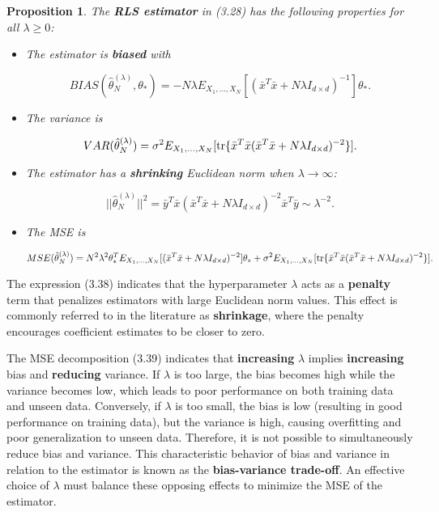 \documentclass{report}
\newtheorem{proposition}{Proposition}[chapter]
\begin{document}
\begin{proposition}
The \textbf{RLS estimator} in (3.28) has the following properties for all $\lambda \geq 0$:
\begin{itemize}
\item The estimator is \textbf{biased} with

\begin{equation}
BIAS(\hat{\theta}_N^{(\lambda)},\theta_*) = -N\lambda E_{X_1,\dots,X_N}[(\bar{x}^T\bar{x}+N\lambda I_{d\times d})^{-1}]\theta_*.
\end{equation}

\item The variance is

\begin{equation}
VAR(\hat{\theta}_N^{(\lambda)}) = \sigma^2E_{X_1,\dots,X_N}[\textup{tr}\{\bar{x}^T\bar{x}(\bar{x}^T\bar{x}+N\lambda I_{d\times d})^{-2}\}].
\end{equation}

\item The estimator has a \textbf{shrinking} Euclidean norm when $\lambda \to \infty$:

\begin{equation}
||\hat{\theta}_N^{(\lambda)}||^2 = \bar{y}^T\bar{x}(\bar{x}^T\bar{x} +N\lambda I_{d\times d})^{-2}\bar{x}^T\bar{y} \sim \lambda^{-2}.
\end{equation}

\item The MSE is

\begin{equation}
MSE(\hat{\theta}_N^{(\lambda)}) = N^2\lambda^2\theta_*^TE_{X_1,\dots,X_N}[(\bar{x}^T\bar{x}+N\lambda I_{d\times d})^{-2}]\theta_* +  \sigma^2E_{X_1,\dots,X_N}[\textup{tr}\{\bar{x}^T\bar{x}(\bar{x}^T\bar{x}+N\lambda I_{d\times d})^{-2}\}].
\end{equation}
\end{itemize}
\end{proposition}

The expression (3.38) indicates that the hyperparameter $\lambda$ acts as a \textbf{penalty} term that penalizes estimators with large Euclidean norm values. This effect is commonly referred to in the literature as \textbf{shrinkage}, where the penalty encourages coefficient estimates to be closer to zero.

The MSE decomposition (3.39) indicates that \textbf{increasing} $\lambda$ implies \textbf{increasing} bias and \textbf{reducing} variance. If $\lambda$ is too large, the bias becomes high while the variance becomes low, which leads to poor performance on both training data and unseen data. Conversely, if $\lambda$ is too small, the bias is low (resulting in good performance on training data), but the variance is high, causing overfitting and poor generalization to unseen data. Therefore, it is not possible to simultaneously reduce bias and variance. This characteristic behavior of bias and variance in relation to the estimator is known as the \textbf{bias-variance trade-off}. An effective choice of $\lambda$ must balance these opposing effects to minimize the MSE of the estimator.
\end{document}
